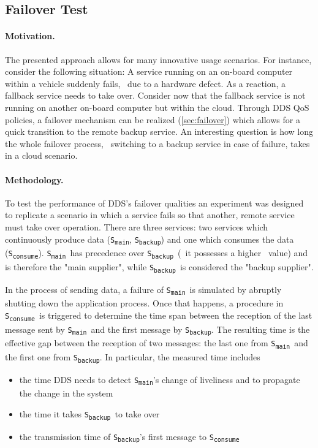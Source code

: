 %
%
%
%
%
%
%
%
%
%


\subsection{Failover Test}\label{sec:failovertest}

\paragraph{Motivation.} The presented approach allows for many innovative usage scenarios. For instance, consider the following situation: A service running on an on-board computer within a vehicle suddenly fails, \eg\ due to a hardware defect. As a reaction, a fallback service needs to take over. Consider now that the fallback service is not running on another on-board computer but within the cloud. Through DDS QoS policies, a failover mechanism can be realized (\cf \autoref{sec:failover}) which allows for a quick transition to the remote backup service. An interesting question is how long the whole failover process, \ie\ switching to a backup service in case of failure, takes in a cloud scenario.


\newcommand{\proda}{\texttt{S\textsubscript{main}}}
\newcommand{\prodb}{\texttt{S\textsubscript{backup}}}
\newcommand{\cons}{\texttt{S\textsubscript{consume}}}

\paragraph{Methodology.} To test the performance of DDS's failover qualities an experiment was designed to replicate a scenario in which a service fails so that another, remote service must take over operation. There are three services: two services which continuously produce data (\proda , \prodb) and one which consumes the data (\cons). \proda\ has precedence over \prodb\ (\ie\ it possesses a higher \ownership\ value) and is therefore the "main supplier", while \prodb\ is considered the "backup supplier". 

In the process of sending data, a failure of \proda\ is simulated by abruptly shutting down the application process. Once that happens, a procedure in \cons\ is triggered to determine the time span between the reception of the last message sent by \proda\ and the first message by \prodb . The resulting time is the effective gap between the reception of two messages: the last one from \proda\ and the first one from \prodb . In particular, the measured time includes
\begin{itemize}
  \item the time DDS needs to detect \proda 's change of liveliness and to propagate the change in the system
  \item the time it takes \prodb\ to take over
  \item the transmission time of \prodb 's first message to \cons
\end{itemize} 

